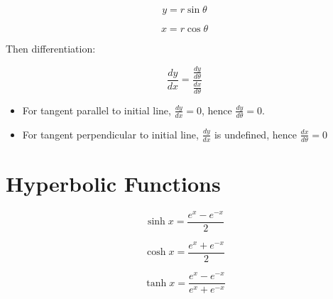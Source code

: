 \documentclass[a4paper,9pt]{scrartcl}
\begin{document}
    \begin{displaymath}
        y = r\sin\theta
    \end{displaymath}

    \begin{displaymath}
        x = r\cos\theta
    \end{displaymath}

    Then differentiation:

    \begin{displaymath}
        \frac{dy}{dx} = \frac{\frac{dy}{d\theta}}{\frac{dx}{d\theta}}
    \end{displaymath}

    \begin{itemize}
        \item For tangent parallel to initial line, $\frac{dy}{dx} = 0$, hence $\frac{dy}{d\theta} = 0$.
        \item For tangent perpendicular to initial line, $\frac{dy}{dx}$ is undefined, hence $\frac{dx}{d\theta} = 0$
    \end{itemize}


    \section{Hyperbolic Functions}
    \begin{displaymath}
        \sinh{x} = \frac{e^x - e^{-x}}{2}
    \end{displaymath}

    \begin{displaymath}
        \cosh{x} = \frac{e^x + e^{-x}}{2}
    \end{displaymath}

    \begin{displaymath}
        \tanh{x} = \frac{e^x - e^{-x}}{e^x + e^{-x}}
    \end{displaymath}

\end{document}
